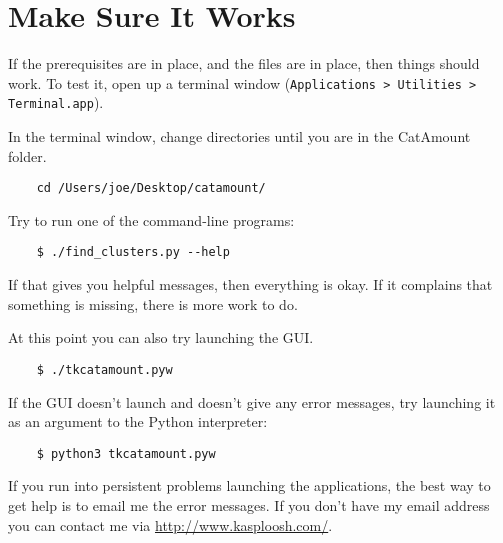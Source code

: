 \section{Make Sure It Works}

If the prerequisites are in place, and the files are in place, then things
should work. To test it, open up a terminal window (\texttt{Applications > Utilities > Terminal.app}).

In the terminal window, change directories until you are in the CatAmount
folder.

\begin{verbatim}
    cd /Users/joe/Desktop/catamount/
\end{verbatim}

Try to run one of the command-line programs:

\begin{verbatim}
    $ ./find_clusters.py --help
\end{verbatim}

If that gives you helpful messages, then everything is okay. If it complains
that something is missing, there is more work to do.

At this point you can also try launching the GUI.

\begin{verbatim}
    $ ./tkcatamount.pyw
\end{verbatim}

If the GUI doesn't launch and doesn't give any error messages, try launching
it as an argument to the Python interpreter:

\begin{verbatim}
    $ python3 tkcatamount.pyw
\end{verbatim}

If you run into persistent problems launching the applications, the best way
to get help is to email me the error messages. If you don't have my email address
you can contact me via \url{http://www.kasploosh.com/}.

